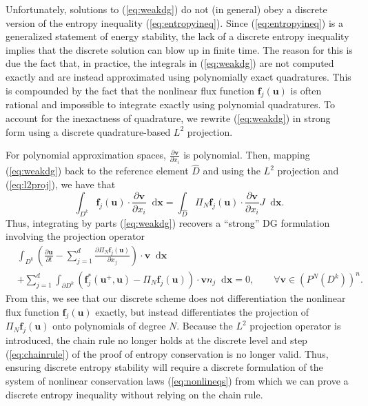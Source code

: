 \documentclass[preprint,10pt]{article}
\theoremstyle{definition}
\theoremstyle{lemma}
\theoremstyle{theorem}
\theoremstyle{assumption}
\renewcommand{\hat}{\widehat}
\newcommand{\pd}[2]{\frac{\partial#1}{\partial#2}}
\newcommand{\LRp}[1]{\left( #1 \right)}
\newcommand*\diff[1]{\mathop{}\!{\mathrm{d}#1}} %
\begin{document}
Unfortunately, solutions to (\ref{eq:weakdg}) do not (in general) obey a discrete version of the entropy inequality (\ref{eq:entropyineq}).  Since (\ref{eq:entropyineq}) is a generalized statement of energy stability, the lack of a discrete entropy inequality implies that the discrete solution can blow up in finite time.  The reason for this is due the fact that, in practice, the integrals in (\ref{eq:weakdg}) are not computed exactly and are instead approximated using polynomially exact quadratures.  This is compounded by the fact that the nonlinear flux  function $\bm{f}_j\LRp{\bm{u}}$ is often rational and impossible to integrate exactly using polynomial quadratures.  To account for the inexactness of quadrature, we rewrite (\ref{eq:weakdg}) in strong form using a discrete quadrature-based $L^2$ projection.  

For polynomial approximation spaces, $\pd{\bm{v}}{x_i}$ is polynomial.  Then, mapping (\ref{eq:weakdg}) back to the reference element $\hat{D}$ and using the $L^2$ projection and (\ref{eq:l2proj}), we have that
\[
\int_{D^k} \bm{f}_j(\bm{u}) \cdot \pd{\bm{v}}{x_i} \diff{\bm{x}} = \int_{\hat{D}} \Pi_N \bm{f}_j(\bm{u}) \cdot \pd{\bm{v}}{x_i} J\diff{\bm{x}}.
\]
Thus, integrating by parts (\ref{eq:weakdg}) recovers a ``strong'' DG formulation involving the projection operator
\begin{align}
&\int_{D^k} \LRp{\pd{\bm{u}}{t} - \sum_{j=1}^d \pd{\Pi_N \bm{f}_j(\bm{u})}{x_j}} \cdot \bm{v} \diff{\bm{x}} \nonumber\\
&+ \sum_{j=1}^d \int_{\partial D^k} \LRp{\bm{f}^*_j\LRp{\bm{u}^+,\bm{u}} - \Pi_N\bm{f}_j(\bm{u})}\cdot \bm{v} n_j  \diff{\bm{x}} = 0, \qquad \forall \bm{v}\in \LRp{P^N\LRp{D^k}}^n.  
\label{eq:strongdg}
\end{align}
From this, we see that our discrete scheme does not differentiation the nonlinear flux function $\bm{f}_j\LRp{\bm{u}}$ exactly, but instead differentiates the projection of $\Pi_N \bm{f}_j\LRp{\bm{u}}$ onto polynomials of degree $N$.  Because the $L^2$ projection operator is introduced, the chain rule no longer holds at the discrete level and step (\ref{eq:chainrule}) of the proof of entropy conservation is no longer valid.  Thus, ensuring discrete entropy stability will require a discrete formulation of the system of nonlinear conservation laws (\ref{eq:nonlineqs}) from which we can prove a discrete entropy inequality without relying on the chain rule.  

\end{document}
